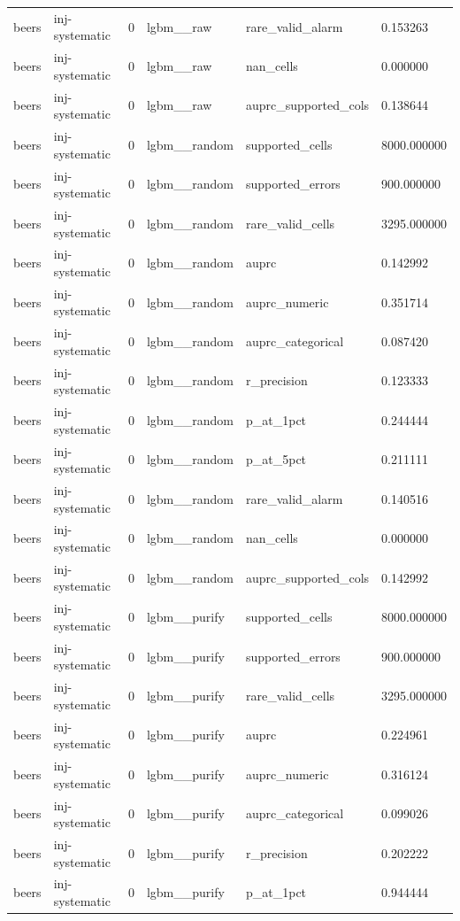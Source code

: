 \begin{tabular}{llllll}
beers & inj-systematic & 0 & lgbm\_\_raw & rare\_valid\_alarm & 0.153263 \\
beers & inj-systematic & 0 & lgbm\_\_raw & nan\_cells & 0.000000 \\
beers & inj-systematic & 0 & lgbm\_\_raw & auprc\_supported\_cols & 0.138644 \\
beers & inj-systematic & 0 & lgbm\_\_random & supported\_cells & 8000.000000 \\
beers & inj-systematic & 0 & lgbm\_\_random & supported\_errors & 900.000000 \\
beers & inj-systematic & 0 & lgbm\_\_random & rare\_valid\_cells & 3295.000000 \\
beers & inj-systematic & 0 & lgbm\_\_random & auprc & 0.142992 \\
beers & inj-systematic & 0 & lgbm\_\_random & auprc\_numeric & 0.351714 \\
beers & inj-systematic & 0 & lgbm\_\_random & auprc\_categorical & 0.087420 \\
beers & inj-systematic & 0 & lgbm\_\_random & r\_precision & 0.123333 \\
beers & inj-systematic & 0 & lgbm\_\_random & p\_at\_1pct & 0.244444 \\
beers & inj-systematic & 0 & lgbm\_\_random & p\_at\_5pct & 0.211111 \\
beers & inj-systematic & 0 & lgbm\_\_random & rare\_valid\_alarm & 0.140516 \\
beers & inj-systematic & 0 & lgbm\_\_random & nan\_cells & 0.000000 \\
beers & inj-systematic & 0 & lgbm\_\_random & auprc\_supported\_cols & 0.142992 \\
beers & inj-systematic & 0 & lgbm\_\_purify & supported\_cells & 8000.000000 \\
beers & inj-systematic & 0 & lgbm\_\_purify & supported\_errors & 900.000000 \\
beers & inj-systematic & 0 & lgbm\_\_purify & rare\_valid\_cells & 3295.000000 \\
beers & inj-systematic & 0 & lgbm\_\_purify & auprc & 0.224961 \\
beers & inj-systematic & 0 & lgbm\_\_purify & auprc\_numeric & 0.316124 \\
beers & inj-systematic & 0 & lgbm\_\_purify & auprc\_categorical & 0.099026 \\
beers & inj-systematic & 0 & lgbm\_\_purify & r\_precision & 0.202222 \\
beers & inj-systematic & 0 & lgbm\_\_purify & p\_at\_1pct & 0.944444 \\

\end{tabular}
